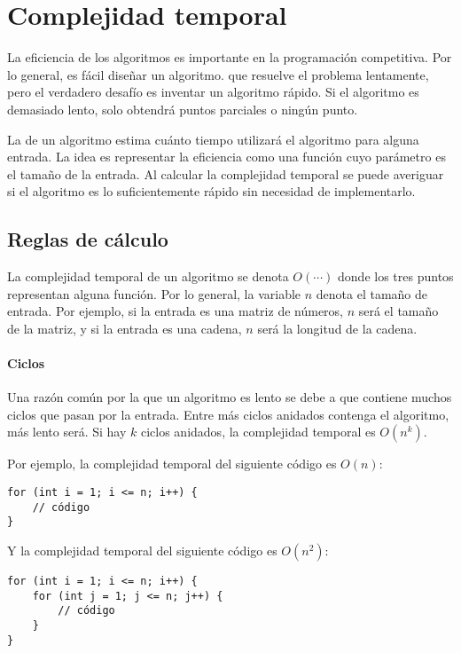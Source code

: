 \chapter{Complejidad temporal}


La eficiencia de los algoritmos es importante en la programación competitiva.
Por lo general, es fácil diseñar un algoritmo.
que resuelve el problema lentamente,
pero el verdadero desafío es inventar un
algoritmo rápido.
Si el algoritmo es demasiado lento, solo obtendrá
puntos parciales o ningún punto.

La  de un algoritmo
estima cuánto tiempo utilizará el algoritmo
para alguna entrada.
La idea es representar la eficiencia
como una función cuyo parámetro es el tamaño de la entrada.
Al calcular la complejidad temporal
se puede averiguar si el algoritmo es lo suficientemente rápido
sin necesidad de implementarlo.

\section{Reglas de cálculo}

La complejidad temporal de un algoritmo
se denota $O(\cdots)$
donde los tres puntos representan alguna
función.
Por lo general, la variable $n$ denota
el tamaño de entrada.
Por ejemplo, si la entrada es una matriz de números,
$n$ será el tamaño de la matriz,
y si la entrada es una cadena,
$n$ será la longitud de la cadena.

\subsubsection*{Ciclos}

Una razón común por la que un algoritmo es lento se debe a
que contiene muchos ciclos que pasan por la entrada.
Entre más ciclos anidados contenga el algoritmo,
más lento será.
Si hay $k$ ciclos anidados,
la complejidad temporal es $O(n^k)$.

Por ejemplo, la complejidad temporal del siguiente código es $O(n)$:
\begin{lstlisting}
for (int i = 1; i <= n; i++) {
    // código
}
\end{lstlisting}

Y la complejidad temporal del siguiente código es $O(n^2)$:
\begin{lstlisting}
for (int i = 1; i <= n; i++) {
    for (int j = 1; j <= n; j++) {
        // código
    }
}
\end{lstlisting}

